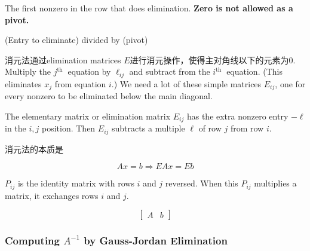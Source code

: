 \begin{definition}[Pivot]
    The first nonzero in the row that does elimination. \textbf{Zero is not allowed as a pivot.}
\end{definition}

\begin{definition}[Multiplier]
    (Entry to eliminate) divided by (pivot)
\end{definition}

消元法通过elimination matrices $E$进行消元操作，使得主对角线以下的元素为0. Multiply the $ j^{\text {th }} $ equation by $ \ell_{i j} $ and subtract from the $ i^{\text {th }} $ equation. (This eliminates $ x_{j} $ from equation $ i $.) We need a lot of these simple matrices $ E_{i j} $, one for every nonzero to be eliminated below the main diagonal.

\begin{definition}
    The elementary matrix or elimination matrix $ E_{i j} $ has the extra nonzero entry $ -\ell $ in the $ i, j $ position. Then $ E_{i j} $ subtracts a multiple $ \ell $ of row $ j $ from row $ i $.
\end{definition}

\begin{theorem}
    消元法的本质是

    \begin{equation}Ax= b \Rightarrow EAx = Eb\end{equation}
\end{theorem}

\begin{definition}
    $  P_{i j} $ is the identity matrix with rows $ i $ and $ j $ reversed. When this  $ P_{i j} $ multiplies a matrix, it exchanges rows $ i $ and $ j $.
\end{definition}

\begin{definition}
    \begin{equation}\displaystyle \left[\begin{matrix}
                A & b
            \end{matrix}\right]\end{equation}
\end{definition}

\subsubsection{Computing $A^{-1}$ by Gauss-Jordan Elimination}

